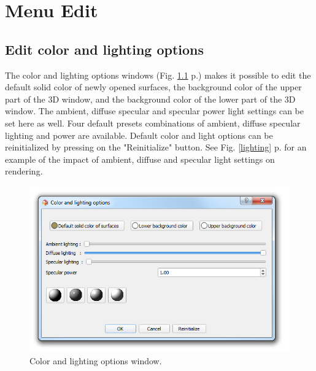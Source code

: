 




\chapter{Menu Edit}
\minitoc  

\section{Edit color and lighting options}

\noindent
The color and lighting options windows (Fig. \ref{color_options} p.\pageref{color_options}) makes it possible to edit the default solid color of newly opened surfaces, the background color of the upper part of the 3D window, and the background color of the lower part of the 3D window. The ambient, diffuse specular and specular power light settings can be set here as well. Four default presets combinations of ambient, diffuse specular lighting and power are available. Default color and light options can be reinitialized by pressing on the "Reinitialize" button. See Fig. \ref{lighting} p.\pageref{lighting} for an example of the impact of ambient, diffuse and specular light settings on rendering.

\begin{figure}
  \centering
  \includegraphics[scale=0.55]{images/08/color_options.png} 
	\caption{Color and lighting options window.}
\label{color_options}
 
\end{figure}

